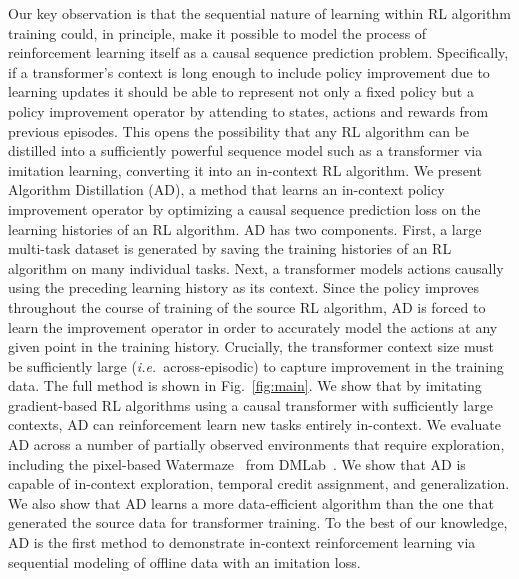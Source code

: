 \documentclass{article}
\theoremstyle{thm}
\newcommand{\name}{AD }
\newcommand{\namedefnospace}{Algorithm Distillation (AD)}
\newcommand{\ie}{{\it i.e.}}
\begin{document}
Our key observation is that the sequential nature of learning within RL algorithm training could, in principle, make it possible to model the process of reinforcement learning itself as a causal sequence prediction problem.
Specifically, if a transformer’s context is long enough to include policy improvement due to learning updates it should be able to represent not only a fixed policy but a policy improvement operator by attending to states, actions and rewards from previous episodes.
This opens the possibility that any RL algorithm can be distilled into a sufficiently powerful sequence model such as a transformer via imitation learning, converting it into an in-context RL algorithm.
We present \namedefnospace, a method that learns an in-context policy improvement operator by optimizing a causal sequence prediction loss on the learning histories of an RL algorithm.
\name has two components. First, a large multi-task dataset is generated by saving the training histories of an RL algorithm on many individual tasks. Next, a transformer models actions causally using the preceding learning history as its context. Since the policy improves throughout the course of training of the source RL algorithm, \name is forced to learn the improvement operator in order to accurately model the actions at any given point in the training history. Crucially, the transformer context size must be sufficiently large (\ie \, across-episodic) to capture improvement in the training data. The full method is shown in Fig.~\ref{fig:main}.
We show that by imitating gradient-based RL algorithms using a causal transformer with sufficiently large contexts, \name can reinforcement learn new tasks entirely in-context. We evaluate \name across a number of partially observed environments that require exploration, including the pixel-based Watermaze~\citep{morris1981watermaze} from DMLab~\citep{beattie2016dmlab}. We show that AD is capable of in-context exploration, temporal credit assignment, and generalization. We also show that AD learns a more data-efficient algorithm than the one that generated the source data for transformer training.
To the best of our knowledge, AD is the first method to demonstrate in-context reinforcement learning via sequential modeling of offline data with an imitation loss.
\end{document}
